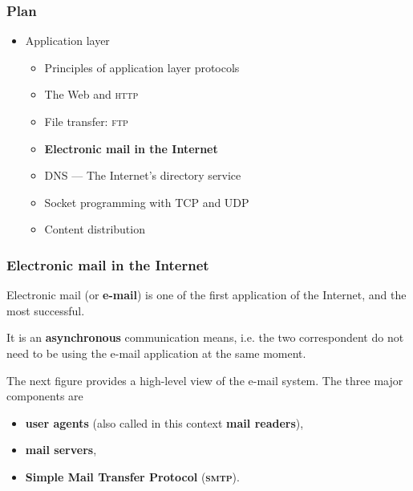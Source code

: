 
%
\begin{frame}
\frametitle{Plan}

\begin{itemize}

  \item Application layer

  \begin{itemize}

    \item Principles of application layer protocols

    \item The Web and \textsc{http}

    \item File transfer: \textsc{ftp}

    \item \textbf{Electronic mail in the Internet}

    \item DNS --- The Internet's directory service

    \item Socket programming with TCP and UDP

    \item Content distribution

  \end{itemize}

\end{itemize}

\end{frame}

%
\begin{frame}
\frametitle{Electronic mail in the Internet}

Electronic mail (or \textbf{e-mail}) is one of the first application
of the Internet, and the most successful.

It is an \textbf{asynchronous} communication means, i.e. the two
correspondent do not need to be using the e-mail application at the
same moment.

The next figure provides a high-level view of the e-mail system. The
three major components are
\begin{itemize}

  \item \textbf{user agents} (also called in this context
  \textbf{mail readers}),

  \item \textbf{mail servers},

  \item \textbf{Simple Mail Transfer Protocol} (\textbf{\textsc{smtp}}).

\end{itemize}


\end{frame}

